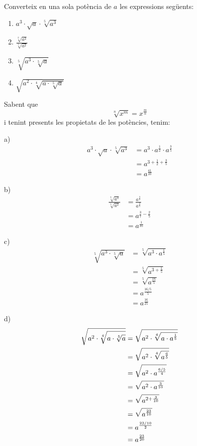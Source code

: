 \begin{exercici}
Converteix en una sola potència de $a$ les expressions següents:

\begin{enumerate}
\item[a)] $a^{3}\cdot \sqrt{a}\cdot \sqrt[5]{a^{3}}$

\item[b)] $\frac{\sqrt[7]{a^{3}}}{\sqrt[5]{a^{2}}}$

\item[c)] $\sqrt[5]{a^{3}\cdot \sqrt[5]{a}}$

\item[d)] $\sqrt{a^{2}\cdot \sqrt[4]{a\cdot \sqrt[5]{a}}}$
\end{enumerate}

\end{exercici}

\begin{solucio}
Sabent que%
\begin{equation*}
\sqrt[n]{x^{m}}=x^{\frac{m}{n}}
\end{equation*}%
i tenint presents les propietats de les potències, tenim:

a)%
\begin{align*}
a^{3}\cdot \sqrt{a}\cdot \sqrt[5]{a^{3}} &=a^{3}\cdot a^{\frac{1}{2}}\cdot
a^{\frac{3}{5}} \\
&=a^{3+\frac{1}{2}+\frac{3}{5}} \\
&=a^{\frac{41}{10}}
\end{align*}

b)%
\begin{align*}
\frac{\sqrt[7]{a^{3}}}{\sqrt[5]{a^{2}}} &=\frac{a^{\frac{3}{7}}}{a^{\frac{2%
}{5}}} \\
&=a^{\frac{3}{7}-\frac{2}{5}} \\
&=a^{\frac{1}{35}}
\end{align*}

c)%
\begin{align*}
\sqrt[5]{a^{3}\cdot \sqrt[5]{a}} &=\sqrt[5]{a^{3}\cdot a^{\frac{1}{5}}} \\
&=\sqrt[5]{a^{3+\frac{1}{5}}} \\
&=\sqrt[5]{a^{\frac{16}{5}}} \\
&=a^{\frac{16/5}{5}} \\
&=a^{\frac{16}{25}}
\end{align*}

d)%
\begin{align*}
\sqrt{a^{2}\cdot \sqrt[4]{a\cdot \sqrt[5]{a}}} &=\sqrt{a^{2}\cdot \sqrt[4]{%
a\cdot a^{\frac{1}{5}}}} \\
&=\sqrt{a^{2}\cdot \sqrt[4]{a^{\frac{6}{5}}}} \\
&=\sqrt{a^{2}\cdot a^{\frac{6/5}{4}}} \\
&=\sqrt{a^{2}\cdot a^{\frac{3}{10}}} \\
&=\sqrt{a^{2+\frac{3}{10}}} \\
&=\sqrt{a^{\frac{23}{10}}} \\
&=a^{\frac{23/10}{2}} \\
&=a^{\frac{23}{20}}
\end{align*}
\end{solucio}

